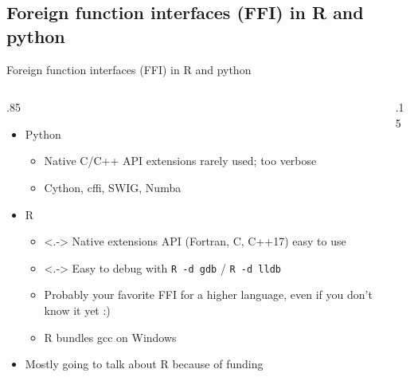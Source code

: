 \documentclass[
aspectratio=169,
xcolor={usenames}
]{beamer}
\begin{document}
\subsection{Foreign function interfaces (FFI) in R and python}
\begin{frame}{Foreign function interfaces (FFI) in R and python}
  \begin{columns}[T]
    \begin{column}{.85\framewidth}
      \begin{itemize}[<+->]
      \item Python
        \begin{itemize}[<.->]
        \item Native C/C++ API extensions rarely used; too verbose
        \item Cython, cffi, SWIG, Numba
        \end{itemize}
      \item R
        \begin{itemize}
        \item<.-> Native extensions API (Fortran, C, C++17) easy to use%
          \footnotemark[1]
        \item<.-> Easy to debug with \texttt{R -d gdb} / \texttt{R -d lldb}
        \item Probably your favorite FFI for a higher language, %
          even if you don't know it yet :)
        \item R bundles gcc on Windows
        \end{itemize}
      \item Mostly going to talk about R because of funding
      \end{itemize}
    \end{column}
    \begin{column}{.15\framewidth}
\end{column}
\end{columns}
\end{frame}
\end{document}
